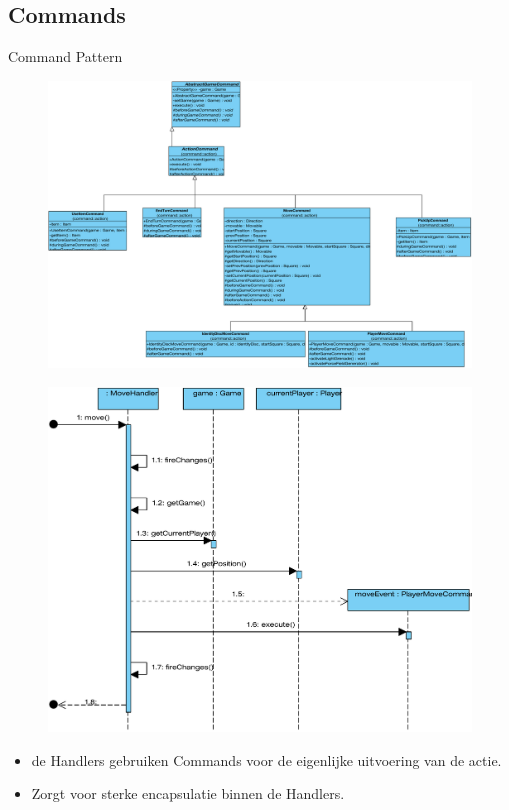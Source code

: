 \documentclass[t]{beamer}
\begin{document}
\subsection{Commands}
\begin{frame}{Command Pattern}
\begin{figure}
	\center
	\includegraphics[width= 0.8\linewidth]{img/Command_pattern.pdf}
\end{figure}	
\end{frame}


\begin{frame}
\begin{multicols}{2}
\begin{minipage}{\columnwidth}
\begin{figure}
	\center
	\includegraphics[width=\linewidth]{img/movehandler}
\end{figure}
\end{minipage}
\begin{minipage}{\columnwidth}
\begin{itemize}
	\item de Handlers gebruiken Commands voor de eigenlijke uitvoering van de actie.
	\item Zorgt voor sterke encapsulatie binnen de Handlers.
\end{itemize}
\end{minipage}
\end{multicols}
\end{frame}
\end{document}
